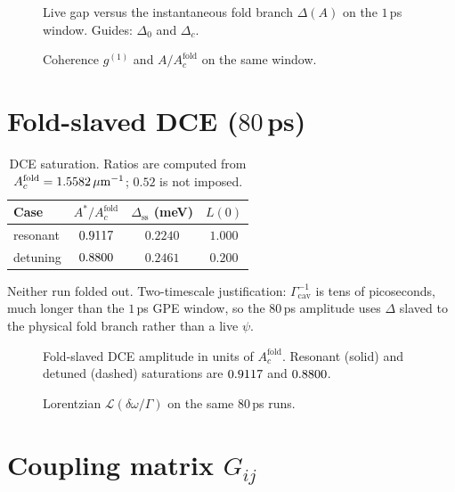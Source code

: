 \documentclass[11pt,letterpaper]{article}
\begin{document}
\begin{figure}[H]
\centering

\caption{Live gap versus the instantaneous fold branch $\Delta(A)$ on the $1$\,ps window. Guides: $\Delta_0$ and $\Delta_c$.}
\label{fig:live-s}
\end{figure}

\begin{figure}[H]
\centering

\caption{Coherence $g^{(1)}$ and $A/A_c^{\mathrm{fold}}$ on the same window.}
\label{fig:g1-s}
\end{figure}

\section{Fold-slaved DCE ($80$\,ps)}
\label{sec:dcerun}

\begin{table}[H]
\centering
\caption{DCE saturation. Ratios are computed from $A_c^{\mathrm{fold}}=1.5582\,\mu\mathrm{m}^{-1}$; $0.52$ is not imposed.}
\label{tab:dce}
\begin{tabular}{@{}lccc@{}}
\toprule
Case & $A^*/A_c^{\mathrm{fold}}$ & $\Delta_{\mathrm{ss}}$ (meV) & $L(0)$ \\
\midrule
resonant & $0.9117$ & $0.2240$ & $1.000$ \\
detuning & $0.8800$ & $0.2461$ & $0.200$ \\
\bottomrule
\end{tabular}
\end{table}

Neither run folded out. Two-timescale justification: $\Gamma_{\mathrm{cav}}^{-1}$ is tens of picoseconds, much longer than the $1$\,ps GPE window, so the $80$\,ps amplitude uses $\Delta$ slaved to the physical fold branch rather than a live $\psi$.

\begin{figure}[H]
\centering

\caption{Fold-slaved DCE amplitude in units of $A_c^{\mathrm{fold}}$. Resonant (solid) and detuned (dashed) saturations are $0.9117$ and $0.8800$.}
\label{fig:dce-s}
\end{figure}

\begin{figure}[H]
\centering

\caption{Lorentzian $\mathcal{L}(\delta\omega/\Gamma)$ on the same $80$\,ps runs.}
\label{fig:lor-s}
\end{figure}

\section{Coupling matrix $G_{ij}$}
\label{sec:gij}
\end{document}
